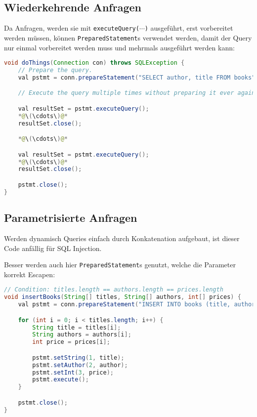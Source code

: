         \subsection{Wiederkehrende Anfragen} %
        	Da Anfragen, werden sie mit \texttt{executeQuery(\(\cdots\))} ausgeführt, erst vorbereitet werden müssen, können \texttt{PreparedStatement}s verwendet werden, damit der Query nur einmal vorbereitet werden muss und mehrmals ausgeführt werden kann:
        	\begin{lstlisting}[language = Java]
void doThings(Connection con) throws SQLException {
	// Prepare the query.
	val pstmt = conn.prepareStatement("SELECT author, title FROM books");

	// Execute the query multiple times without preparing it ever again.

	val resultSet = pstmt.executeQuery();
	*@\(\cdots\)@*
	resultSet.close();

	*@\(\cdots\)@*

	val resultSet = pstmt.executeQuery();
	*@\(\cdots\)@*
	resultSet.close();

	pstmt.close();
}
        	\end{lstlisting}

        \subsection{Parametrisierte Anfragen} %
			Werden dynamisch Queries einfach durch Konkatenation aufgebaut, ist dieser Code anfällig für SQL Injection.
			
			Besser werden auch hier \texttt{PreparedStatement}s genutzt, welche die Parameter korrekt Escapen:
			\begin{lstlisting}[language = Java]
// Condition: titles.length == authors.length == prices.length
void insertBooks(String[] titles, String[] authors, int[] prices) {
	val pstmt = conn.prepareStatement("INSERT INTO books (title, author, price), (?, ?, ?)");

	for (int i = 0; i < titles.length; i++) {
		String title = titles[i];
		String authors = authors[i];
		int price = prices[i];

		pstmt.setString(1, title);
		pstmt.setAuthor(2, author);
		pstmt.setInt(3, price);
		pstmt.execute();
	}

	pstmt.close();
}
			\end{lstlisting}

